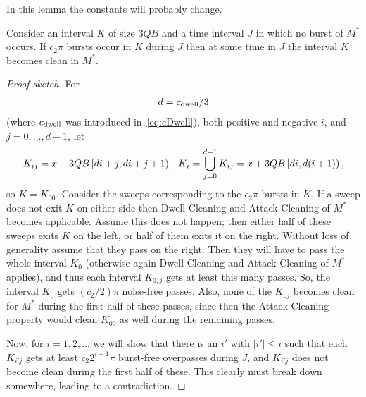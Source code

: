 \documentclass[12pt]{memoir}
\renewcommand{\le}{\leq}
\def\B{B}
\newcommand{\Q}{Q}
\newcommand{\Cns}[2]{#1_{\textrm{\upshape #2}}}
\newcommand{\cns}[1]{\Cns{c}{#1}}
\newcommand{\cDwell}{\cns{dwell}}
\begin{document}
In this lemma the constants will probably change.
\begin{lemma}\label{lem:burst-density}
  Consider an interval \( K \) of size \( 3 \Q\B \) and a time interval \( J \) in which
no burst of \( M^{*} \) occurs.
If \( c_{2}\pi \) bursts occur in \( K \) during \( J \) then at some time in \( J \)
the interval \( K \) becomes clean in \( M^{*} \).
\end{lemma}
\begin{proof}[Proof sketch]
For 
\begin{align*}
 d=\cDwell/3
\end{align*}
(where \( \cDwell \) was introduced in~\eqref{eq:cDwell}),
both positive and negative \( i \), and \( j=0,\dots,d-1 \), let
\begin{align*}
   K_{ij}=x+3\Q\B\lint{d i+j}{d i+j+1},\ 
K_{i}=\bigcup_{j=0}^{d-1}K_{ij}=x+3\Q\B\lint{di}{d(i+1)},
 \end{align*}
so \( K=K_{00} \).
Consider the sweeps corresponding to the \( c_{2}\pi \) bursts in \( K \).
If a sweep does not exit \( K \) on either side then Dwell Cleaning and Attack Cleaning
of \( M^{*} \) becomes applicable.
Assume this does not happen; then
either half of these sweeps exits \( K \) on the left, or half of them exits it on the right.
Without loss of generality assume that they pass on the right.
Then they will have to pass the whole interval \( K_{0} \) (otherwise again Dwell Cleaning
and Attack Cleaning of \( M^{*} \)
applies), and thus each interval \( K_{0,j} \) gets at least this many passes.
So, the interval \( K_{0} \) gets \( (c_{2}/2)\pi \) noise-free passes.
Also, none of the \( K_{0j} \) becomes clean for \( M^{*} \) during the first half of these passes,
since then the Attack Cleaning property would clean \( K_{00} \) as well during the remaining
passes.

Now, for \( i=1,2,\dots \) we will show that there is 
an \( i'  \) with \( |i'|\le i \) such that each \( K_{i'j} \)
gets at least \( c_{2} 2^{i-1}\pi \) burst-free overpasses  during \( J \), 
and \( K_{i'j} \) does not become clean during the first half of these.
This clearly must break down somewhere, leading to a contradiction.


\end{proof}
\end{document}
